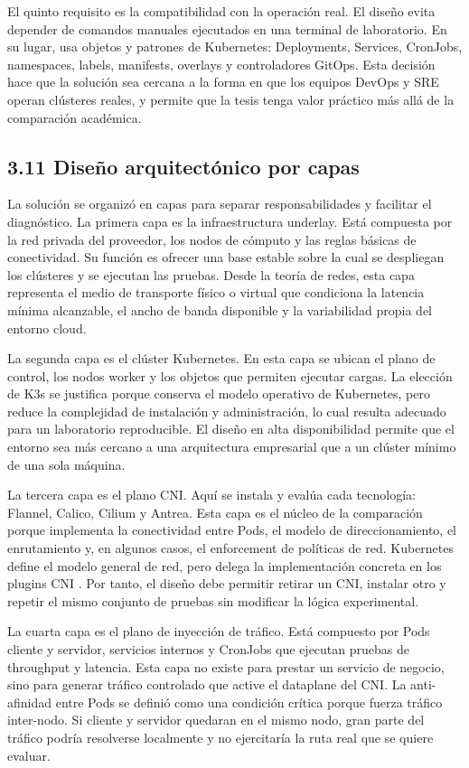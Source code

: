 El quinto requisito es la compatibilidad con la operación real. El diseño evita depender de comandos manuales ejecutados en una terminal de laboratorio. En su lugar, usa objetos y patrones de Kubernetes: Deployments, Services, CronJobs, namespaces, labels, manifests, overlays y controladores GitOps. Esta decisión hace que la solución sea cercana a la forma en que los equipos DevOps y SRE operan clústeres reales, y permite que la tesis tenga valor práctico más allá de la comparación académica.

\subsection{3.11 Diseño arquitectónico por capas}

La solución se organizó en capas para separar responsabilidades y facilitar el diagnóstico. La primera capa es la infraestructura underlay. Está compuesta por la red privada del proveedor, los nodos de cómputo y las reglas básicas de conectividad. Su función es ofrecer una base estable sobre la cual se despliegan los clústeres y se ejecutan las pruebas. Desde la teoría de redes, esta capa representa el medio de transporte físico o virtual que condiciona la latencia mínima alcanzable, el ancho de banda disponible y la variabilidad propia del entorno cloud.

La segunda capa es el clúster Kubernetes. En esta capa se ubican el plano de control, los nodos worker y los objetos que permiten ejecutar cargas. La elección de K3s se justifica porque conserva el modelo operativo de Kubernetes, pero reduce la complejidad de instalación y administración, lo cual resulta adecuado para un laboratorio reproducible. El diseño en alta disponibilidad permite que el entorno sea más cercano a una arquitectura empresarial que a un clúster mínimo de una sola máquina.

La tercera capa es el plano CNI. Aquí se instala y evalúa cada tecnología: Flannel, Calico, Cilium y Antrea. Esta capa es el núcleo de la comparación porque implementa la conectividad entre Pods, el modelo de direccionamiento, el enrutamiento y, en algunos casos, el enforcement de políticas de red. Kubernetes define el modelo general de red, pero delega la implementación concreta en los plugins CNI \cite{ref4,ref18}. Por tanto, el diseño debe permitir retirar un CNI, instalar otro y repetir el mismo conjunto de pruebas sin modificar la lógica experimental.

La cuarta capa es el plano de inyección de tráfico. Está compuesto por Pods cliente y servidor, servicios internos y CronJobs que ejecutan pruebas de throughput y latencia. Esta capa no existe para prestar un servicio de negocio, sino para generar tráfico controlado que active el dataplane del CNI. La anti-afinidad entre Pods se definió como una condición crítica porque fuerza tráfico inter-nodo. Si cliente y servidor quedaran en el mismo nodo, gran parte del tráfico podría resolverse localmente y no ejercitaría la ruta real que se quiere evaluar.

